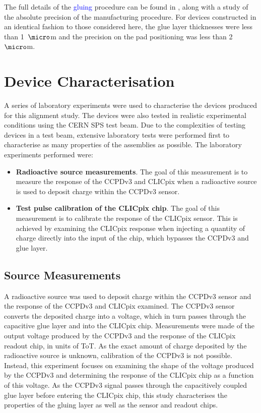 The full details of the \textcolor{blue}{gluing} procedure can be found in \cite{FabricationNote}, along with a study of the absolute precision of the manufacturing procedure.  For devices constructed in an identical fashion to those considered here, the glue layer thicknesses were less than 1~${\micro}$m and the precision on the pad positioning was less than 2~${\micro}$m.  


\section{Device Characterisation}
A series of laboratory experiments were used to characterise the devices produced for this alignment study.  The devices were also tested in realistic experimental conditions using the CERN SPS test beam.  Due to the complexities of testing devices in a test beam, extensive laboratory tests were performed first to characterise as many properties of the assemblies as possible.  The laboratory experiments performed were:

\begin{itemize}
\item \textbf{Radioactive source measurements}.  The goal of this measurement is to measure the response of the CCPDv3 and CLICpix when a radioactive source is used to deposit charge within the CCPDv3 sensor.  
\item \textbf{Test pulse calibration of the CLICpix chip}.  The goal of this measurement is to calibrate the response of the CLICpix sensor.  This is achieved by examining the CLICpix response when injecting a quantity of charge directly into the input of the chip, which bypasses the CCPDv3 and glue layer.
\end{itemize} 


\subsection{Source Measurements}
\label{sec:source}
A radioactive source was used to deposit charge within the CCPDv3 sensor and the response of the CCPDv3 and CLICpix examined.  The CCPDv3 sensor converts the deposited charge into a voltage, which in turn passes through the capacitive glue layer and into the CLICpix chip.  Measurements were made of the output voltage produced by the CCPDv3 and the response of the CLICpix readout chip, in units of ToT.  As the exact amount of charge deposited by the radioactive source is unknown, calibration of the CCPDv3 is not possible.  Instead, this experiment focuses on examining the shape of the voltage produced by the CCPDv3 and determining the response of the CLICpix chip as a function of this voltage.  As the CCPDv3 signal passes through the capacitively coupled glue layer before entering the CLICpix chip, this study characterises the properties of the gluing layer as well as the sensor and readout chips.


